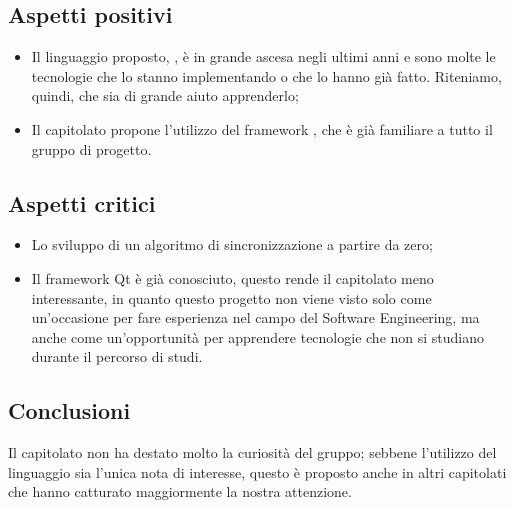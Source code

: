 \subsection{Aspetti positivi}
\begin{itemize}
\item Il linguaggio proposto, , è in grande ascesa negli ultimi anni e sono molte le tecnologie che lo stanno implementando o che lo hanno già fatto. Riteniamo, quindi, che sia di grande aiuto apprenderlo;
\item Il capitolato propone l'utilizzo del framework , che è già familiare a tutto il gruppo di progetto.
\end{itemize}

\subsection{Aspetti critici}
\begin{itemize}
\item Lo sviluppo di un algoritmo di sincronizzazione a partire da zero;
\item Il framework Qt è già conosciuto, questo rende il capitolato meno interessante, in quanto questo progetto non viene visto solo come un'occasione per fare esperienza nel campo del Software Engineering, ma anche come un'opportunità per apprendere tecnologie che non si studiano durante il percorso di studi.
\end{itemize}

\subsection{Conclusioni}
Il capitolato non ha destato molto la curiosità del gruppo; sebbene l'utilizzo del linguaggio  sia l'unica nota di interesse, questo è proposto anche in altri capitolati che hanno catturato maggiormente la nostra attenzione.
